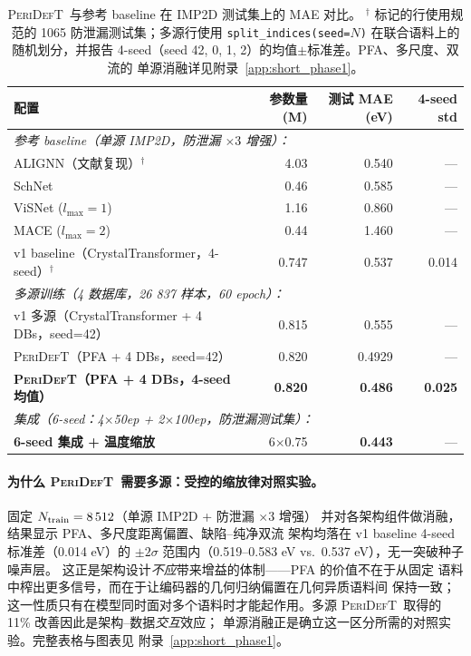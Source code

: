 \documentclass[UTF8,11pt,a4paper]{ctexart}
\newcommand{\modelname}{\textsc{PeriDefT}}
\begin{document}
\begin{table}[h]
\centering
\caption{\modelname\ 与参考 baseline 在 IMP2D 测试集上的 MAE 对比。
$^\dagger$ 标记的行使用规范的 1065 防泄漏测试集；多源行使用
\texttt{split\_indices(seed=$N$)} 在联合语料上的随机划分，并报告
4-seed（seed 42, 0, 1, 2）的均值$\pm$标准差。PFA、多尺度、双流的
单源消融详见附录~\ref{app:short_phase1}。}
\label{tab:headline_short}
\begin{tabular}{lrrr}
\toprule
配置 & 参数量 (M) & 测试 MAE (eV) & 4-seed std \\
\midrule
\multicolumn{4}{l}{\emph{参考 baseline（单源 IMP2D，防泄漏 $\times 3$ 增强）：}} \\
ALIGNN（文献复现）$^\dagger$                          & 4.03 & 0.540   & --- \\
SchNet                                                & 0.46 & 0.585   & --- \\
ViSNet ($l_{\max}=1$)                                 & 1.16 & 0.860   & --- \\
MACE ($l_{\max}=2$)                                   & 0.44 & 1.460   & --- \\
v1 baseline（CrystalTransformer，4-seed）$^\dagger$   & 0.747 & 0.537  & 0.014 \\
\midrule
\multicolumn{4}{l}{\emph{多源训练（4 数据库，26 837 样本，60 epoch）：}} \\
v1 多源（CrystalTransformer + 4 DBs，seed=42）        & 0.815 & 0.555  & --- \\
\modelname{}（PFA + 4 DBs，seed=42）                  & 0.820 & 0.4929 & --- \\
\textbf{\modelname{}（PFA + 4 DBs，4-seed 均值）}     & \textbf{0.820} & \textbf{0.486} & \textbf{0.025} \\
\midrule
\multicolumn{4}{l}{\emph{集成（6-seed：4$\times$50ep + 2$\times$100ep，防泄漏测试集）：}} \\
\textbf{6-seed 集成 + 温度缩放}                       & 6$\times$0.75 & \textbf{0.443} & --- \\
\bottomrule
\end{tabular}
\end{table}

\paragraph{为什么 \modelname\ 需要多源：受控的缩放律对照实验。}
\label{sec:phase1_short}
固定 $N_{\rm train}=8\,512$（单源 IMP2D + 防泄漏 $\times 3$ 增强）
并对各架构组件做消融，结果显示 PFA、多尺度距离偏置、缺陷--纯净双流
架构均落在 v1 baseline 4-seed 标准差（0.014 eV）的 $\pm 2\sigma$
范围内（0.519--0.583 eV vs.\ 0.537 eV），无一突破种子噪声层。
这正是架构设计\emph{不应}带来增益的体制——PFA 的价值不在于从固定
语料中榨出更多信号，而在于让编码器的几何归纳偏置在几何异质语料间
保持一致；这一性质只有在模型同时面对多个语料时才能起作用。多源
\modelname\ 取得的 11\% 改善因此是架构--数据\emph{交互}效应；
单源消融正是确立这一区分所需的对照实验。完整表格与图表见
附录~\ref{app:short_phase1}。
\end{document}
